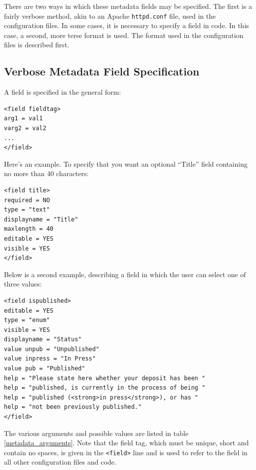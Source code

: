 There are two ways in which these metadata fields may be specified. The first is a fairly verbose method, akin to an Apache {\tt httpd.conf} file, used in the configuration files. In some cases, it is necessary to specify a field in code. In this case, a second, more terse format is used. The format used in the configuration files is described first.

\subsection{Verbose Metadata Field Specification}

A field is specified in the general form:

\begin{verbatim}
<field fieldtag>
arg1 = val1
varg2 = val2
...
</field>
\end{verbatim}

Here's an example. To specify that you want an optional ``Title'' field containing no more than 40 characters:

\begin{verbatim}
<field title>
required = NO
type = "text"
displayname = "Title"
maxlength = 40
editable = YES
visible = YES
</field>
\end{verbatim}

Below is a second example, describing a field in which the user can select one of three values:

\begin{verbatim}
<field ispublished>
editable = YES
type = "enum"
visible = YES
displayname = "Status"
value unpub = "Unpublished"
value inpress = "In Press"
value pub = "Published"
help = "Please state here whether your deposit has been "
help = "published, is currently in the process of being "
help = "published (<strong>in press</strong>), or has "
help = "not been previously published."
</field>
\end{verbatim}

The various arguments and possible values are listed in table \ref{metadata_arguments}. Note that the field tag, which must be unique, short and contain no spaces, is given in the {\tt <field>} line and is used to refer to the field in all other configuration files and code.

